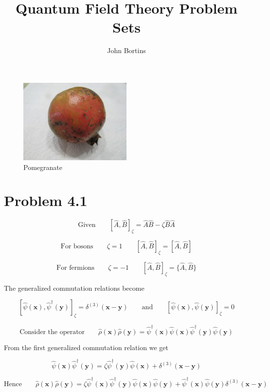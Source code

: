 \documentclass{amsart}
\title{Quantum Field Theory Problem Sets}
\author{John Bortins}
\begin{document}
 
\maketitle{}
\begin{figure}[H]
    \centering
    \includegraphics[width=0.5\textwidth]{IMG_0873}
    \caption{Pomegranate}
    \label{fig:awesome_image}
\end{figure}

\section*{Problem 4.1}
 
\[\text{Given}\qquad [\hat{A},\hat{B}]_{\zeta} = \hat{A}\hat{B}-\zeta\hat{B}\hat{A}\]

\[\text{For bosons}\qquad \zeta=1 \qquad[\hat{A},\hat{B}]_{\zeta} = [\hat{A},\hat{B}]\]

\[\text{For fermions}\qquad \zeta=-1 \qquad[\hat{A},\hat{B}]_{\zeta} = \{\hat{A},\hat{B}\}\]

The generalized commutation relations become

\[ [\hat{\psi}(\boldsymbol{x}),\hat{\psi}^\dagger(\boldsymbol{y})]_{\zeta} =\delta^{(3)}(\boldsymbol{x}-\boldsymbol{y})  \qquad\text{and}\qquad[\hat{\psi}(\boldsymbol{x}),\hat{\psi}(\boldsymbol{y})]_{\zeta} =0\]

\[ \text{Consider the operator}\qquad \hat{\rho}(\boldsymbol{x})\hat{\rho}(\boldsymbol{y})=
   \hat{\psi}^\dagger(\boldsymbol{x})\hat{\psi}(\boldsymbol{x})\hat{\psi}^\dagger(\boldsymbol{y})\hat{\psi}(\boldsymbol{y}) \]  

   From the first generalized commutation relation we get

\[  \hat{\psi}(\boldsymbol{x})\hat{\psi}^\dagger(\boldsymbol{y}) = \zeta \hat{\psi}^\dagger(\boldsymbol{y})\hat{\psi}(\boldsymbol{x})+\delta^{(3)}(\boldsymbol{x}-\boldsymbol{y})\]

\[ \text{Hence}\qquad \hat{\rho}(\boldsymbol{x})\hat{\rho}(\boldsymbol{y})=
    \zeta\hat{\psi}^\dagger(\boldsymbol{x})\hat{\psi}^\dagger(\boldsymbol{y})\hat{\psi}(\boldsymbol{x})\hat{\psi}(\boldsymbol{y})+
    \hat{\psi}^\dagger(\boldsymbol{x})\hat{\psi}(\boldsymbol{y})\delta^{(3)}(\boldsymbol{x}-\boldsymbol{y})\]  
\end{document}
